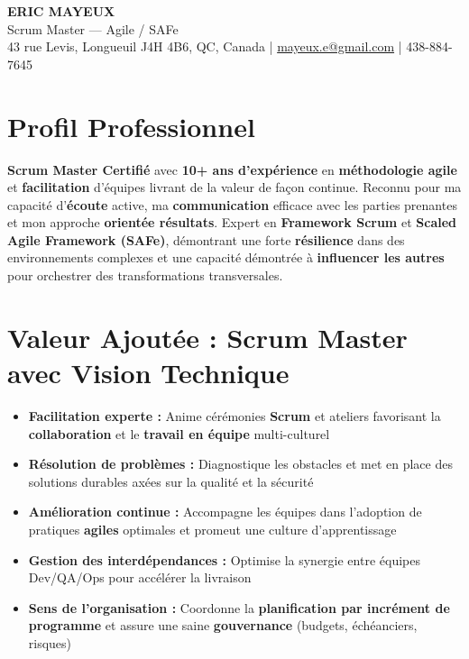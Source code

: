 \documentclass[11pt,a4paper]{article}
\newcommand{\highlight}[1]{\textcolor{primaryblue}{\textbf{#1}}}
\newcommand{\keypoint}[1]{\textbf{#1}}
\begin{document}
\begin{center}
    {\LARGE \textbf{ERIC MAYEUX}}\\
    \vspace{2pt}
    {\normalsize Scrum Master — Agile / SAFe}\\
    \vspace{3pt}
    43 rue Levis, Longueuil J4H 4B6, QC, Canada |
    \href{mailto:mayeux.e@gmail.com}{mayeux.e@gmail.com} | 438-884-7645
\end{center}

\section*{Profil Professionnel}
\noindent
\highlight{Scrum Master Certifié} avec \keypoint{10+ ans d'expérience} en \highlight{méthodologie agile} et \highlight{facilitation} d'équipes livrant de la valeur de façon continue. Reconnu pour ma capacité d'\highlight{écoute} active, ma \highlight{communication} efficace avec les parties prenantes et mon approche \highlight{orientée résultats}. Expert en \highlight{Framework Scrum} et \highlight{Scaled Agile Framework (SAFe)}, démontrant une forte \highlight{résilience} dans des environnements complexes et une capacité démontrée à \highlight{influencer les autres} pour orchestrer des transformations transversales.

\section*{Valeur Ajoutée : Scrum Master avec Vision Technique}
\begin{itemize}[leftmargin=10pt]
    \item \highlight{Facilitation experte :} Anime cérémonies \highlight{Scrum} et ateliers favorisant la \highlight{collaboration} et le \highlight{travail en équipe} multi-culturel
    \item \highlight{Résolution de problèmes :} Diagnostique les obstacles et met en place des solutions durables axées sur la qualité et la sécurité
    \item \highlight{Amélioration continue :} Accompagne les équipes dans l'adoption de pratiques \highlight{agiles} optimales et promeut une culture d'apprentissage
    \item \highlight{Gestion des interdépendances :} Optimise la synergie entre équipes Dev/QA/Ops pour accélérer la livraison
    \item \highlight{Sens de l'organisation :} Coordonne la \highlight{planification par incrément de programme} et assure une saine \highlight{gouvernance} (budgets, échéanciers, risques)
\end{itemize}
\end{document}
